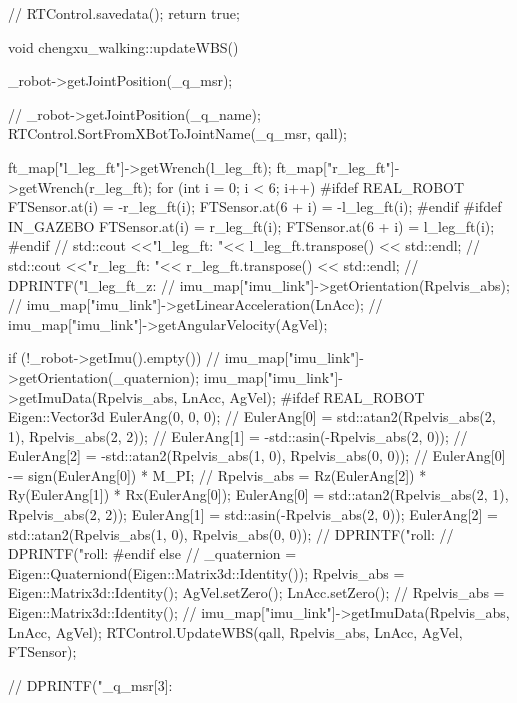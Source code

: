 {{	// RTControl.savedata();
	return true;
}

void chengxu_walking::updateWBS()
{
	_robot->getJointPosition(_q_msr);

	// 	_robot->getJointPosition(_q_name);
	RTControl.SortFromXBotToJointName(_q_msr, qall);

	ft_map["l_leg_ft"]->getWrench(l_leg_ft);
	ft_map["r_leg_ft"]->getWrench(r_leg_ft);
	for (int i = 0; i < 6; i++) {
#ifdef REAL_ROBOT
		FTSensor.at(i) = -r_leg_ft(i);
		FTSensor.at(6 + i) = -l_leg_ft(i);
#endif
#ifdef IN_GAZEBO
		FTSensor.at(i) = r_leg_ft(i);
		FTSensor.at(6 + i) = l_leg_ft(i);
#endif
	}
	// std::cout <<"l_leg_ft: "<< l_leg_ft.transpose() << std::endl;
	// std::cout <<"r_leg_ft: "<< r_leg_ft.transpose() << std::endl;
//         DPRINTF("l_leg_ft_z: %
	// imu_map["imu_link"]->getOrientation(Rpelvis_abs);
	// imu_map["imu_link"]->getLinearAcceleration(LnAcc);
	// imu_map["imu_link"]->getAngularVelocity(AgVel);

	if (!_robot->getImu().empty()) {
		// imu_map["imu_link"]->getOrientation(_quaternion);
		imu_map["imu_link"]->getImuData(Rpelvis_abs, LnAcc, AgVel);
#ifdef REAL_ROBOT
		Eigen::Vector3d EulerAng(0, 0, 0);
// 		EulerAng[0] = std::atan2(Rpelvis_abs(2, 1), Rpelvis_abs(2, 2));
// 		EulerAng[1] = -std::asin(-Rpelvis_abs(2, 0));
// 		EulerAng[2] = -std::atan2(Rpelvis_abs(1, 0), Rpelvis_abs(0, 0));
//              EulerAng[0] -= sign(EulerAng[0]) * M_PI;
// 		Rpelvis_abs = Rz(EulerAng[2]) * Ry(EulerAng[1]) * Rx(EulerAng[0]);
                EulerAng[0] = std::atan2(Rpelvis_abs(2, 1), Rpelvis_abs(2, 2));
                EulerAng[1] = std::asin(-Rpelvis_abs(2, 0));
                EulerAng[2] = std::atan2(Rpelvis_abs(1, 0), Rpelvis_abs(0, 0));
//                 DPRINTF("roll: %
//                 DPRINTF("roll: %
#endif
	}
	else {
		// _quaternion = Eigen::Quaterniond(Eigen::Matrix3d::Identity());
		Rpelvis_abs = Eigen::Matrix3d::Identity();
		AgVel.setZero();
		LnAcc.setZero();
	}
	// Rpelvis_abs = Eigen::Matrix3d::Identity();
	// imu_map["imu_link"]->getImuData(Rpelvis_abs, LnAcc, AgVel);
	RTControl.UpdateWBS(qall, Rpelvis_abs, LnAcc, AgVel, FTSensor);

//         DPRINTF("_q_msr[3]: %
}

}
